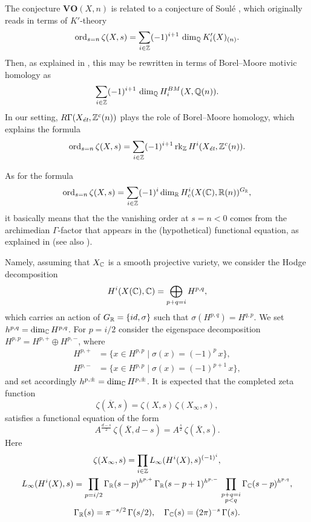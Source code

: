 \documentclass{article}
\numberwithin{equation}{section}
\begin{document}
\begin{remark}
  The conjecture $\mathbf{VO} (X,n)$ is related to a conjecture of Soulé
  \cite[Conjecture~2.2]{Soule-1984-ICM}, which originally reads in terms of
  $K'$-theory
  \[ \ord_{s=n} \zeta (X,s) =
    \sum_{i \in \ZZ} (-1)^{i+1} \, \dim_\QQ K'_i (X)_{(n)}. \]
  Then, as explained in \cite[Remark~43]{Kahn-2005}, this may be rewritten in
  terms of Borel--Moore motivic homology as
  $$\sum_{i \in \ZZ} (-1)^{i+1} \, \dim_\QQ H_i^{BM} (X, \QQ (n)).$$
  In our setting, $R\Gamma (X_\et, \ZZ^c (n))$ plays the role of Borel--Moore
  homology, which explains the formula
  \[ \ord_{s=n} \zeta (X,s) =
    \sum_{i \in \ZZ} (-1)^{i+1} \rk_\ZZ H^i (X_\et, \ZZ^c (n)). \]
\end{remark}

\begin{remark}
  \label{rmk:archimedian-euler-factor}
  As for the formula
  \[ \ord_{s=n} \zeta (X,s) =
    \sum_{i \in \ZZ} (-1)^i \dim_\RR H^i_c (X(\CC), \RR (n))^{G_\RR}, \]
  it basically means that the the vanishing order at $s = n < 0$ comes from the
  archimedian $\Gamma$-factor that appears in the (hypothetical) functional
  equation, as explained in \cite[\S\S 3,4]{Serre-1970}
  (see also \cite[\S 4]{Flach-Morin-2020}).

  Namely, assuming that $X_\CC$ is a smooth projective variety, we consider the
  Hodge decomposition
  \[ H^i (X (\CC), \CC) = \bigoplus_{p+q = i} H^{p,q}, \]
  which carries an action of $G_\RR = \{ id, \sigma \}$ such that
  $\sigma (H^{p,q}) = H^{q,p}$. We set $h^{p,q} = \dim_\CC H^{p,q}$.
  For $p = i/2$ consider the eigenspace decomposition
  $H^{p,p} = H^{p,+} \oplus H^{p,-}$, where
  \begin{align*}
    H^{p,+} & = \{ x \in H^{p,p} \mid \sigma (x) = (-1)^p\,x \},\\
    H^{p,-} & = \{ x \in H^{p,p} \mid \sigma (x) = (-1)^{p+1}\,x \},
  \end{align*}
  and set accordingly $h^{p,\pm} = \dim_\CC H^{p,\pm}$.
  It is expected that the completed zeta function
  $$\zeta (\overline{X}, s) = \zeta (X, s)\,\zeta (X_\infty, s),$$
  satisfies a functional equation of the form
  \[ A^{\frac{d-s}{2}}\,\zeta (\overline{X},d-s) =
    A^{\frac{s}{2}}\,\zeta (\overline{X},s). \]
  Here
  \begin{gather*}
    \zeta (X_\infty, s) = \prod_{i\in \ZZ} L_\infty (H^i (X),s)^{(-1)^i}, \\
    L_\infty (H^i (X), s) =
    \prod_{p = i/2} \Gamma_\RR (s - p)^{h^{p,+}}\,\Gamma_\RR (s-p+1)^{h^{p,-}} \,
    \prod_{\substack{p + q = i \\ p < q}} \Gamma_\CC (s - p)^{h^{p,q}}, \\
    \Gamma_\RR (s) = \pi^{-s/2} \, \Gamma (s/2), \quad
    \Gamma_\CC (s) = (2\pi)^{-s} \, \Gamma (s).
  \end{gather*}


\end{remark}
\end{document}
